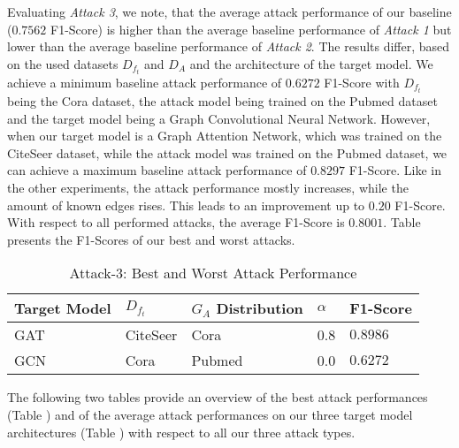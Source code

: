             Evaluating \emph{Attack 3}, we note, that the average attack performance of our baseline ($0.7562$ F1-Score) is higher than the average baseline performance of \emph{Attack 1} but lower than the average baseline performance of \emph{Attack 2}.
            The results differ, based on the used datasets $D_{f_t}$ and $D_A$ and the architecture of the target model.
            We achieve a minimum baseline attack performance of $0.6272$ F1-Score with $D_{f_t}$ being the Cora dataset, the attack model being trained on the Pubmed dataset and the target model being a Graph Convolutional Neural Network.
            However, when our target model is a Graph Attention Network, which was trained on the CiteSeer dataset, while the attack model was trained on the Pubmed dataset, we can achieve a maximum baseline attack performance of $0.8297$ F1-Score.  
            Like in the other experiments, the attack performance mostly increases, while the amount of known edges rises.
            This leads to an improvement up to $0.20$ F1-Score.
            With respect to all performed attacks, the average F1-Score is $0.8001$.
            Table  presents the F1-Scores of our best and worst attacks.
            
            \vspace{0.48cm}
            \begin{table}[!h]
                \centering
                \footnotesize
                \begin{tabular}{l|l|l|l|l|}
                \toprule
                Target Model & $D_{f_t}$ & $G_A$ Distribution & $\alpha$ & F1-Score \\
                \midrule 
                GAT & CiteSeer & Cora   & 0.8 & $0.8986$ \\
                GCN & Cora     & Pubmed & 0.0 & $0.6272$ \\
                
                \bottomrule
                \end{tabular}
                \caption{Attack-3: Best and Worst Attack Performance}
                \label{table:attack3-best-and-worst-performance}
            \end{table}
        
        The following two tables provide an overview of the best attack performances (Table ) and of the average attack performances on our three target model architectures (Table ) with respect to all our three attack types.

